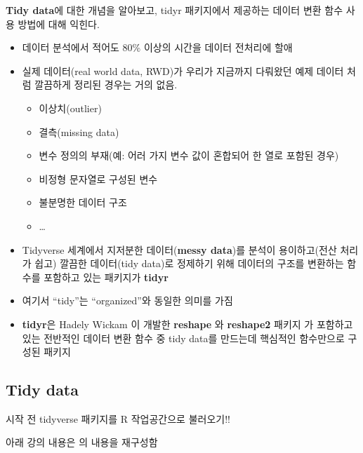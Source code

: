\documentclass[
  11pt,
]{krantz}
\makeatletter
\providecommand{\tightlist}{%
  \setlength{\itemsep}{0pt}\setlength{\parskip}{0pt}}
\newenvironment{kframe}{%
\medskip{}
\setlength{\fboxsep}{.8em}
 \def\at@end@of@kframe{}%
 \ifinner\ifhmode%
  \def\at@end@of@kframe{\end{minipage}}%
  \begin{minipage}{\columnwidth}%
 \fi\fi%
 \def\FrameCommand##1{\hskip\@totalleftmargin \hskip-\fboxsep
 \colorbox{shadecolor}{##1}\hskip-\fboxsep
     \hskip-\linewidth \hskip-\@totalleftmargin \hskip\columnwidth}%
 \MakeFramed {\advance\hsize-\width
   \@totalleftmargin\z@ \linewidth\hsize
   \@setminipage}}%
 {\par\unskip\endMakeFramed%
 \at@end@of@kframe}
\renewenvironment{quote}{\begin{kframe}}{\end{kframe}}
\let\BeginKnitrBlock\begin \let\EndKnitrBlock\end
\makeatother
\begin{document}
\footnotesize

\BeginKnitrBlock{rmdnote}
\textbf{Tidy data}에 대한 개념을 알아보고, tidyr 패키지에서 제공하는 데이터 변환 함수 사용 방법에 대해 익힌다.
\EndKnitrBlock{rmdnote}

\normalsize

\begin{itemize}
\item
  데이터 분석에서 적어도 80\% 이상의 시간을 데이터 전처리에 할애
\item
  실제 데이터(real world data, RWD)가 우리가 지금까지 다뤄왔던 예제 데이터 처럼 깔끔하게 정리된 경우는 거의 없음.

  \begin{itemize}
  \tightlist
  \item
    이상치(outlier)
  \item
    결측(missing data)
  \item
    변수 정의의 부재(예: 어러 가지 변수 값이 혼합되어 한 열로 포함된 경우)
  \item
    비정형 문자열로 구성된 변수
  \item
    불분명한 데이터 구조
  \item
    \ldots{}
  \end{itemize}
\item
  Tidyverse 세계에서 지저분한 데이터(\textbf{messy data})를 분석이 용이하고(전산 처리가 쉽고) 깔끔한 데이터(tidy data)로 정제하기 위해 데이터의 구조를 변환하는 함수를 포함하고 있는 패키지가 \textbf{tidyr}
\item
  여기서 ``tidy''는 ``organized''와 동일한 의미를 가짐
\item
  \textbf{tidyr}은 Hadely Wickam 이 개발한 \textbf{reshape} 와 \textbf{reshape2} 패키지 \citep{wickham-2007p}가 포함하고 있는 전반적인 데이터 변환 함수 중 tidy data를 만드는데 핵심적인 함수만으로 구성된 패키지
\end{itemize}

\hypertarget{tidy-data}{%
\subsection{Tidy data}\label{tidy-data}}

\footnotesize

\BeginKnitrBlock{rmdwarning}
시작 전 tidyverse 패키지를 R 작업공간으로 불러오기!!
\EndKnitrBlock{rmdwarning}

\normalsize

\begin{quote}
아래 강의 내용은 \citet{wickham-2014p} 의 내용을 재구성함
\end{quote}
\end{document}

